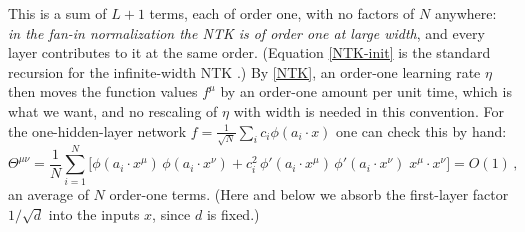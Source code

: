 \documentclass[11pt]{article}
\begin{document}
%
This is a sum of $L+1$ terms, each of order one, with no factors of $N$ anywhere: \emph{in the fan-in normalization the NTK is of order one at large width}, and every layer contributes to it at the same order. (Equation \eqref{NTK-init} is the standard recursion for the infinite-width NTK \cite{jacot2018neural}.) By \eqref{NTK}, an order-one learning rate $\eta$ then moves the function values $f^\mu$ by an order-one amount per unit time, which is what we want, and no rescaling of $\eta$ with width is needed in this convention. For the one-hidden-layer network $f = \frac{1}{\sqrt N}\sum_i c_i\phi(a_i\cdot x)$ one can check this by hand:
%
\begin{equation} \label{NTK-L1}
    \Theta^{\mu\nu} = \frac{1}{N}\sum_{i=1}^N\Big[\phi(a_i\cdot x^\mu)\,\phi(a_i\cdot x^\nu) + c_i^2\,\phi'(a_i\cdot x^\mu)\,\phi'(a_i\cdot x^\nu)\;x^\mu\!\cdot x^\nu\Big] = O(1)\,,
\end{equation}
%
an average of $N$ order-one terms. (Here and below we absorb the first-layer factor $1/\sqrt d$ into the inputs $x$, since $d$ is fixed.)
\end{document}
